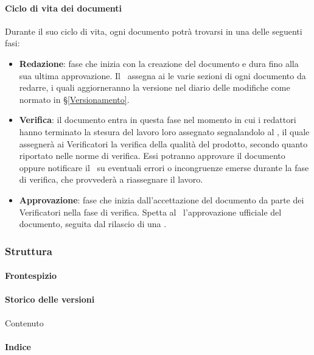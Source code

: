 			\paragraph{Ciclo di vita dei documenti}\label{PS:Documentazione:Implementazione:CicloVita}
			Durante il suo ciclo di vita, ogni documento potrà trovarsi in una delle seguenti fasi:
			\begin{itemize}
				\item \textbf{Redazione}: fase che inizia con la creazione del documento e dura fino alla sua ultima approvazione.
					Il \Res\ assegna ai  le varie sezioni di ogni documento da redarre, i quali aggiorneranno la versione nel diario delle modifiche
					come normato in \S\ref{Versionamento}.
				\item \textbf{Verifica}: il documento entra in questa fase nel momento in cui i redattori hanno terminato la stesura del lavoro loro assegnato
					segnalandolo al \Res, il quale assegnerà ai Verificatori la verifica della qualità del prodotto, secondo quanto riportato nelle norme di verifica.
					Essi potranno approvare il documento oppure notificare il \Res\ su eventuali errori o incongruenze emerse durante la fase di verifica, che provvederà
					a riassegnare il lavoro.
				\item \textbf{Approvazione}: fase che inizia dall'accettazione del documento da parte dei Verificatori nella fase di verifica. Spetta al \Res\
					l'approvazione ufficiale del documento, seguita dal rilascio di una . 
			\end{itemize}

		\subsubsection{Struttura}\label{PS:Documentazione:Struttura}

			\paragraph{Frontespizio}\label{PS:Documentazione:Struttura:Frontespizio}
				

			\paragraph{Storico delle versioni}\label{PS:Documentazione:Struttura:StoricoVersioni}
			Contenuto

			\paragraph{Indice}\label{PS:Documentazione:Struttura:Indice}

